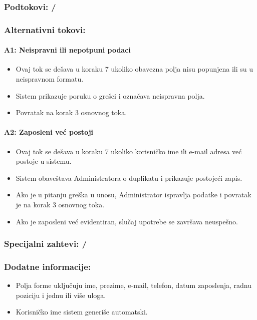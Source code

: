 \subsubsection*{Podtokovi: /}

\subsubsection*{Alternativni tokovi:}

\paragraph*{A1: Neispravni ili nepotpuni podaci}
\begin{itemize}
	\item Ovaj tok se dešava u koraku 7 ukoliko obavezna polja nisu popunjena ili su u neispravnom formatu.
	\item Sistem prikazuje poruku o grešci i označava neispravna polja.
	\item Povratak na korak 3 osnovnog toka.
\end{itemize}

\paragraph*{A2: Zaposleni već postoji}
\begin{itemize}
	\item Ovaj tok se dešava u koraku 7 ukoliko korisničko ime ili e-mail adresa već postoje u sistemu.
	\item Sistem obaveštava Administratora o duplikatu i prikazuje postojeći zapis.
	\item Ako je u pitanju greška u unosu, Administrator ispravlja podatke i povratak je na korak 3 osnovnog toka.
	\item Ako je zaposleni već evidentiran, slučaj upotrebe se završava neuspešno.
\end{itemize}

\subsubsection*{Specijalni zahtevi: /}

\subsubsection*{Dodatne informacije:}
\begin{itemize}
	\item Polja forme uključuju ime, prezime, e-mail, telefon, datum zaposlenja, radnu poziciju i jednu ili više uloga.
	\item Korisničko ime sistem generiše automatski.
\end{itemize}


